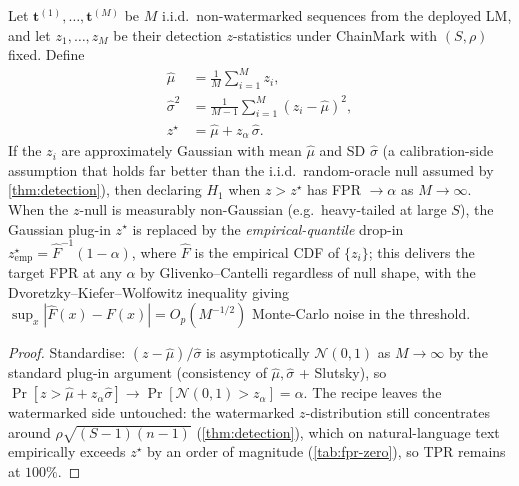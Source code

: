 \begin{proposition}
  \label{thm:detection-recal}
  Let $\mathbf{t}^{(1)}, \dots, \mathbf{t}^{(M)}$ be $M$
  i.i.d.\ non-watermarked sequences from the deployed LM, and let
  $z_1, \dots, z_M$ be their detection $z$-statistics under ChainMark with
  $(S, \rho)$ fixed.  Define
  \begin{align*}
    \hat\mu &= \tfrac{1}{M}\sum_{i=1}^M z_i, \\
    \hat\sigma^2 &= \tfrac{1}{M-1}\sum_{i=1}^M (z_i - \hat\mu)^2, \\
    z^\star &= \hat\mu + z_\alpha\,\hat\sigma.
  \end{align*}
  If the $z_i$ are approximately Gaussian with mean $\hat\mu$ and SD
  $\hat\sigma$ (a calibration-side assumption that holds far better
  than the i.i.d.\ random-oracle null assumed by
  \autoref{thm:detection}), then declaring $H_1$ when $z > z^\star$
  has FPR $\to \alpha$ as $M\to\infty$. When the $z$-null is
  measurably non-Gaussian (e.g.\ heavy-tailed at large $S$), the
  Gaussian plug-in $z^\star$ is replaced by the
  \emph{empirical-quantile} drop-in
  $z^\star_{\mathrm{emp}} = \hat F^{-1}(1{-}\alpha)$, where
  $\hat F$ is the empirical CDF of $\{z_i\}$; this delivers the
  target FPR at any $\alpha$ by Glivenko--Cantelli regardless of
  null shape, with the
  Dvoretzky--Kiefer--Wolfowitz inequality giving
  $\sup_x\!|\hat F(x) - F(x)| = O_p(M^{-1/2})$ Monte-Carlo noise in
  the threshold.
\end{proposition}

\begin{proof}
  Standardise: $(z - \hat\mu)/\hat\sigma$ is asymptotically
  $\mathcal{N}(0,1)$ as $M\to\infty$ by the standard plug-in
  argument (consistency of $\hat\mu, \hat\sigma$ + Slutsky), so
  $\Pr[z > \hat\mu + z_\alpha\hat\sigma] \to \Pr[\mathcal{N}(0,1) >
  z_\alpha] = \alpha$.  The recipe leaves the watermarked side
  untouched: the watermarked $z$-distribution still concentrates
  around $\rho\sqrt{(S-1)(n-1)}$ (\autoref{thm:detection}), which on
  natural-language text empirically exceeds $z^\star$ by an order of
  magnitude (\autoref{tab:fpr-zero}), so TPR remains at $100\%$.
\end{proof}


